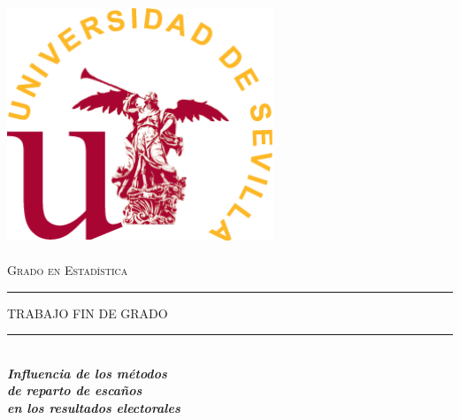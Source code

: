 \documentclass[12pt,a4paper,]{book}
\title{}
\author{}
\date{}
\numberwithin{dummy}{section}
\theoremstyle{ocrenumbox}
\theoremstyle{blacknumex}
\theoremstyle{blacknumbox}
\theoremstyle{ocrenum}
\theoremstyle{ocrenum}
\begin{document}
\begin{titlepage}

\newcommand{\HRule}{\rule{\linewidth}{0.5mm}} %

\center %


\begin{minipage}{14cm}
\center

\includegraphics[width=8cm,height=8cm]{logo}\\[0.5cm] %


\textsc{\LARGE Grado en Estadística}\\[2.5cm] 



\rule[1.7mm]{2cm}{0.5mm}
\hfill
\textsc{\Large TRABAJO FIN DE GRADO} 
\hfill
\rule[1.7mm]{2cm}{0.5mm} 
\\[0.75cm]

{\Huge
\textbf{\textit{
Influencia de los métodos \\[0.2cm]
de reparto de escaños \\[0.5cm]
en los resultados electorales
}}}\\[0.75cm] 


\end{minipage}
\end{titlepage}
\end{document}
